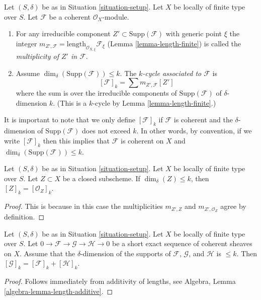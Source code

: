 \begin{definition}
\label{definition-cycle-associated-to-coherent-sheaf}
Let $(S, \delta)$ be as in Situation \ref{situation-setup}.
Let $X$ be locally of finite type over $S$.
Let $\mathcal{F}$ be a coherent $\mathcal{O}_X$-module.
\begin{enumerate}
\item For any irreducible component $Z' \subset \text{Supp}(\mathcal{F})$
with generic point $\xi$ the integer
$m_{Z', \mathcal{F}} = \text{length}_{\mathcal{O}_{X, \xi}} \mathcal{F}_\xi$
(Lemma \ref{lemma-length-finite})
is called the {\it multiplicity of $Z'$ in $\mathcal{F}$}.
\item Assume $\dim_\delta(\text{Supp}(\mathcal{F})) \leq k$.
The {\it $k$-cycle associated to $\mathcal{F}$} is
$$
[\mathcal{F}]_k
=
\sum m_{Z', \mathcal{F}}[Z']
$$
where the sum is over the irreducible components of
$\text{Supp}(\mathcal{F})$ of $\delta$-dimension $k$.
(This is a $k$-cycle by Lemma \ref{lemma-length-finite}.)
\end{enumerate}
\end{definition}

\noindent
It is important to note that we only define $[\mathcal{F}]_k$
if $\mathcal{F}$ is coherent and the $\delta$-dimension
of $\text{Supp}(\mathcal{F})$ does not exceed $k$. In other words,
by convention, if we write $[\mathcal{F}]_k$ then this implies that
$\mathcal{F}$ is coherent on $X$ and
$\dim_\delta(\text{Supp}(\mathcal{F})) \leq k$.

\begin{lemma}
\label{lemma-cycle-closed-coherent}
Let $(S, \delta)$ be as in Situation \ref{situation-setup}.
Let $X$ be locally of finite type over $S$.
Let $Z \subset X$ be a closed subscheme.
If $\dim_\delta(Z) \leq k$, then $[Z]_k = [{\mathcal O}_Z]_k$.
\end{lemma}

\begin{proof}
This is because in this case the multiplicities $m_{Z', Z}$ and
$m_{Z', \mathcal{O}_Z}$ agree by definition.
\end{proof}

\begin{lemma}
\label{lemma-additivity-sheaf-cycle}
Let $(S, \delta)$ be as in Situation \ref{situation-setup}.
Let $X$ be locally of finite type over $S$.
Let $0 \to \mathcal{F} \to \mathcal{G} \to \mathcal{H} \to 0$
be a short exact sequence of coherent sheaves on $X$.
Assume that the $\delta$-dimension of the supports
of $\mathcal{F}$, $\mathcal{G}$, and $\mathcal{H}$ is $\leq k$.
Then $[\mathcal{G}]_k = [\mathcal{F}]_k + [\mathcal{H}]_k$.
\end{lemma}

\begin{proof}
Follows immediately from additivity of lengths, see
Algebra, Lemma \ref{algebra-lemma-length-additive}.
\end{proof}









